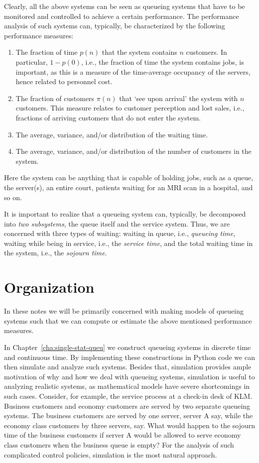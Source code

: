 Clearly, all the above systems can be seen as queueing systems that
have to be monitored and controlled to achieve a certain
performance. The performance analysis of such systems can, typically,
be characterized by the following performance measures:
\begin{enumerate}
\item The fraction of time $p(n)$ that the system contains $n$
  customers. In particular, $1-p(0)$, i.e., the fraction of time the
  system contains jobs, is important, as this is a measure of the
  time-average occupancy of the servers, hence related to personnel
  cost.
\item The fraction of customers $\pi(n)$ that `see upon arrival' the
  system with $n$ customers. This measure relates to customer
  perception and lost sales, i.e., fractions of arriving customers
  that do not enter the system.
\item The average, variance, and/or distribution of the waiting time.
\item The average, variance, and/or distribution of the number of customers in the system.\
\end{enumerate}
Here the system can be anything that is capable of holding jobs, such
as a queue, the server(s), an entire court, patients waiting for
an MRI scan in a hospital, and so on.

It is important to realize that a queueing system can, typically, be
decomposed into \emph{two subsystems}, the queue itself and the
service system. Thus, we are concerned with three types of waiting:
waiting in queue, i.e., \emph{queueing time}, waiting while being in
service, i.e., the \emph{service time}, and the total waiting time in
the system, i.e., the \emph{sojourn time}.

\section*{Organization}


In these notes we will be primarily concerned with making models of queueing systems such that we can compute or estimate the above mentioned performance measures.

In Chapter~\ref{cha:single-stat-queu} we construct queueing systems in discrete time and continuous time.
By implementing these constructions in Python code we can then simulate and analyze such systems.
Besides that, simulation provides ample motivation of why and how we deal with queueing systems, simulation is useful to analyzing realistic systems, as mathematical models have severe shortcomings in such cases.
Consider, for example, the service process at a check-in desk of KLM.
Business customers and economy customers are served by two separate queueing systems.
The business customers are served by one server, server A say, while the economy class customers by three servers, say.
What would happen to the sojourn time of the business customers if server A would be allowed to serve economy class customers when the business queue is empty?
For the analysis of such complicated control policies, simulation is the most natural approach.

